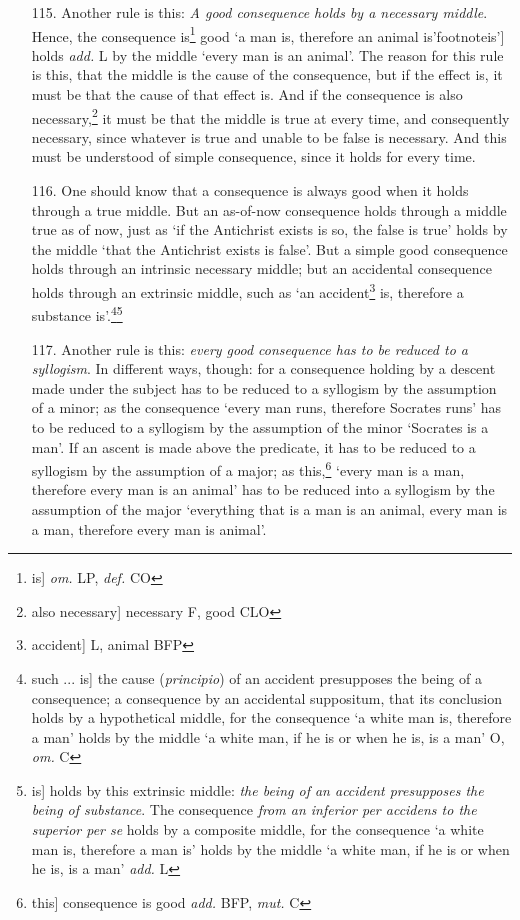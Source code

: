 \begin{itemize}
\item[115.] Another rule is this: \textit{A good consequence holds by a necessary middle}. Hence, the consequence is\footnote{is] \textit{om.} LP, \textit{def.} CO} good `a man is, therefore an animal is'footnote{is'] holds \textit{add.} L} by the middle `every man is an animal'. The reason for this rule is this, that the middle is the cause of the consequence, but if the effect is, it must be that the cause of that effect is. And if the consequence is also necessary,\footnote{also necessary] necessary F, good CLO} it must be that the middle is true at every time, and consequently necessary, since whatever is true and unable to be false is necessary. And this must be understood of simple consequence, since it holds for every time.
\item[116.] One should know that a consequence is always good when it holds through a true middle. But an as-of-now consequence holds through a middle true as of now, just as `if the Antichrist exists is so, the false is true' holds by the middle `that the Antichrist exists is false'. But a simple good consequence holds through an intrinsic necessary middle; but an accidental consequence holds through an extrinsic middle, such as `an accident\footnote{accident] L, animal BFP} is, therefore a substance is'.\footnote{such ... is] the cause (\textit{principio}) of an accident presupposes the being of a consequence; a consequence by an accidental suppositum, that its conclusion holds by a hypothetical middle, for the consequence `a white man is, therefore a man' holds by the middle `a white man, if he is or when he is, is a man' O, \textit{om.} C}\footnote{is] holds by this extrinsic middle: \textit{the being of an accident presupposes the being of substance}. The consequence \textit{from an inferior per accidens to the superior per se} holds by a composite middle, for the consequence `a white man is, therefore a man is' holds by the middle `a white man, if he is or when he is, is a man' \textit{add.} L}
\item[117.] Another rule is this: \textit{every good consequence has to be reduced to a syllogism}. In different ways, though: for a consequence holding by a descent made under the subject has to be reduced to a syllogism by the assumption of a minor; as the consequence `every man runs, therefore Socrates runs' has to be reduced to a syllogism by the assumption of the minor `Socrates is a man'. If an ascent is made above the predicate, it has to be reduced to a syllogism by the assumption of a major; as this,\footnote{this] consequence is good \textit{add.} BFP, \textit{mut.} C} `every man is a man, therefore every man is an animal' has to be reduced into a syllogism by the assumption of the major `everything that is a man is an animal, every man is a man, therefore every man is animal'.

\end{itemize}
